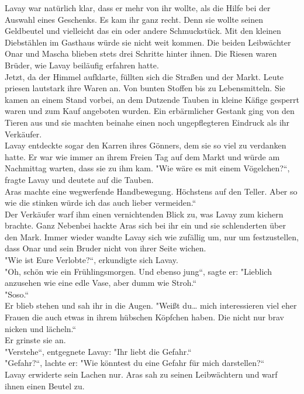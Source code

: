 Lavay war natürlich klar, dass er mehr von ihr wollte, als die Hilfe bei der Auswahl eines 
Geschenks. Es kam ihr ganz recht. Denn sie wollte seinen Geldbeutel und vielleicht das ein oder 
andere Schmuckstück. Mit den kleinen Diebstählen im Gasthaus würde sie nicht weit kommen. Die beiden 
Leibwächter Onar und Mascha blieben stets drei Schritte hinter ihnen. Die Riesen waren Brüder, wie 
Lavay beiläufig erfahren hatte. \\
Jetzt, da der Himmel aufklarte, füllten sich die Straßen und der Markt. Leute priesen lautstark 
ihre Waren an. Von bunten Stoffen bis zu Lebensmitteln. Sie kamen an einem Stand vorbei, an dem 
Dutzende Tauben in kleine Käfige gesperrt waren und zum Kauf angeboten wurden. Ein erbärmlicher 
Gestank ging von den Tieren aus und sie machten beinahe einen noch ungepflegteren Eindruck als ihr 
Verkäufer.\\
Lavay entdeckte sogar den Karren ihres Gönners, dem sie so viel zu verdanken hatte. Er war wie 
immer an ihrem Freien Tag auf dem Markt und würde am Nachmittag warten, dass sie zu ihm kam.
"Wie wäre es mit einem Vögelchen?``, fragte Lavay und deutete auf die Tauben.\\
Aras machte eine wegwerfende Handbewegung. Höchstens auf den Teller. Aber so wie die stinken würde 
ich das auch lieber vermeiden.``\\
Der Verkäufer warf ihm einen vernichtenden Blick zu, was Lavay zum kichern brachte. Ganz Nebenbei 
hackte Aras sich bei ihr ein und sie schlenderten über den Mark. Immer wieder wandte Lavay sich wie 
zufällig um, nur um festzustellen, dass Onar und sein Bruder nicht von ihrer Seite wichen.\\
"Wie ist Eure Verlobte?``, erkundigte sich Lavay.\\
"Oh, schön wie ein Frühlingsmorgen. Und ebenso jung``, sagte er: "Lieblich anzusehen wie eine edle 
Vase, aber dumm wie Stroh.``\\
"Soso.``\\
Er blieb stehen und sah ihr in die Augen. "Weißt du… mich interessieren viel eher Frauen die auch 
etwas in ihrem hübschen Köpfchen haben. Die nicht nur brav nicken und lächeln.``\\
Er grinste sie an.\\
"Verstehe``, entgegnete Lavay: "Ihr liebt die Gefahr.``\\
"Gefahr?``, lachte er: "Wie könntest du eine Gefahr für mich darstellen?``\\
Lavay erwiderte sein Lachen nur. Aras sah zu seinen Leibwächtern und warf ihnen einen Beutel zu. 
